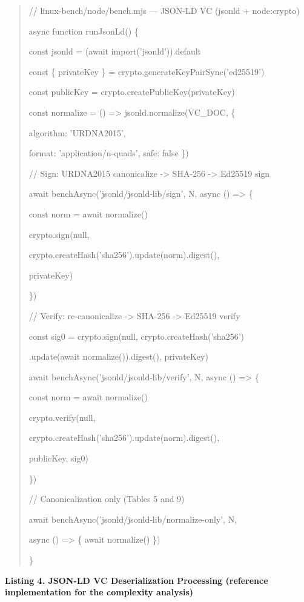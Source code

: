 \begin{quote}
// linux-bench/node/bench.mjs --- JSON-LD VC (jsonld + node:crypto)

async function runJsonLd() \{

const jsonld = (await import('jsonld')).default

const \{ privateKey \} = crypto.generateKeyPairSync('ed25519')

const publicKey = crypto.createPublicKey(privateKey)

const normalize = () =\textgreater{} jsonld.normalize(VC\_DOC, \{

algorithm: 'URDNA2015',

format: 'application/n-quads', safe: false \})

// Sign: URDNA2015 canonicalize -\textgreater{} SHA-256 -\textgreater{} Ed25519 sign

await benchAsync('jsonld/jsonld-lib/sign', N, async () =\textgreater{} \{

const norm = await normalize()

crypto.sign(null,

crypto.createHash('sha256').update(norm).digest(),

privateKey)

\})

// Verify: re-canonicalize -\textgreater{} SHA-256 -\textgreater{} Ed25519 verify

const sig0 = crypto.sign(null, crypto.createHash('sha256')

.update(await normalize()).digest(), privateKey)

await benchAsync('jsonld/jsonld-lib/verify', N, async () =\textgreater{} \{

const norm = await normalize()

crypto.verify(null,

crypto.createHash('sha256').update(norm).digest(),

publicKey, sig0)

\})

// Canonicalization only (Tables 5 and 9)

await benchAsync('jsonld/jsonld-lib/normalize-only', N,

async () =\textgreater{} \{ await normalize() \})

\}
\end{quote}

\textbf{Listing 4. JSON-LD VC Deserialization Processing (reference implementation for the complexity analysis)}

